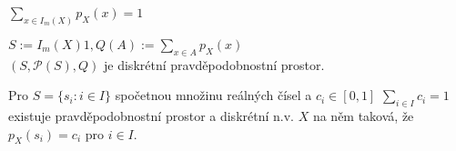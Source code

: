 \documentclass[../main.tex]{subfiles}
\begin{document}
\begin{definition}
    $\sum_{x\in I_m(X)}p_X(x) = 1$
\end{definition}

\begin{definition}
    $S:= I_m(X) 1, Q(A):=\sum_{x\in A} p_X(x)$\\
    $(S,\mathcal{P}(S),Q)$ je diskrétní pravděpodobnostní prostor.
\end{definition}

\begin{definition}
    Pro $S = \{s_i : i \in I\}$ spočetnou množinu reálných čísel a $c_i \in [0,1]$ $\sum_{i\in I} c_i =1$ existuje pravděpodobnostní
    prostor a diskrétní n.v. $X$ na něm taková, že $p_X(s_i) = c_i$ pro $i \in I$.
\end{definition}
\end{document}
